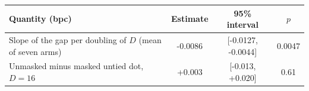 \begin{tabular}{lccc}
\toprule
Quantity (bpc) & Estimate & 95\% interval & $p$ \\
\midrule
Slope of the gap per doubling of $D$ (mean of seven arms) & -0.0086 & [-0.0127, -0.0044] & 0.0047 \\
Unmasked minus masked untied dot, $D=16$ & +0.003 & [-0.013, +0.020] & 0.61 \\
\bottomrule
\end{tabular}
